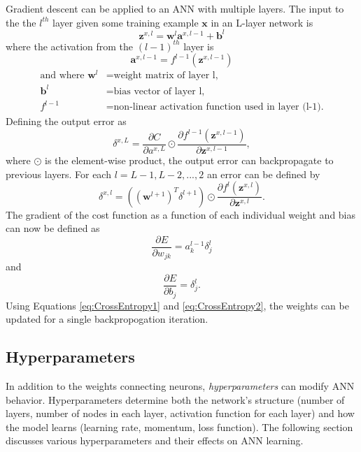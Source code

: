 Gradient descent can be applied to an ANN with multiple layers. The input to the the $l^{th}$ layer given some training example $\boldsymbol{x}$ in an L-layer network is 
\begin{equation}
\boldsymbol{z}^{x,l} = \boldsymbol{w}^{l}  \boldsymbol{a}^{x,l-1} + \boldsymbol{b}^{l}
\end{equation}
%
where the activation from the $(l-1)^{th}$ layer is
%
\begin{equation}
\boldsymbol{a}^{x,l-1} = f^{l-1}(\boldsymbol{z}^{x,l-1})
\end{equation}
\begin{align*}
  \text{and where } \boldsymbol{w}^{l} &= \text{weight matrix of layer l,} \\
  \boldsymbol{b}^{l} &= \text{bias vector of layer l,} \\
  f^{l-1} &= \text{non-linear activation function used in layer (l-1).}
\end{align*}
%
Defining the output error as 
%
\begin{equation}
\delta^{x,L} = \frac{\partial C}{\partial a^{x,L}} \odot \frac{\partial f^{l-1}(\boldsymbol{z}^{x,l-1}) }{\partial \boldsymbol{z}^{x,l-1}}, 
\end{equation}
%
where $\odot$ is the element-wise product, the output error can backpropagate to previous layers. For each $l=L-1,L-2,...,2$ an error can be defined by
%
\begin{equation}
\delta^{x,l} = ((\boldsymbol{w}^{l+1})^T \delta^{l+1}) \odot \frac{\partial f^{l}(\boldsymbol{z}^{x,l}) }{\partial \boldsymbol{z}^{x,l}}.
\end{equation}
%
The gradient of the cost function as a function of each individual weight and bias can now be defined as 
%
\begin{equation} \label{eq:CrossEntropy1}
\frac{\partial E}{\partial w_{jk}} = a^{l-1}_k \delta^l_j
\end{equation}
%
and 
%
\begin{equation} \label{eq:CrossEntropy2}
\frac{\partial E}{\partial b_j} = \delta^l_j.
\end{equation}
%
Using Equations \ref{eq:CrossEntropy1} and \ref{eq:CrossEntropy2}, the weights can be updated for a single backpropogation iteration. 


\subsection{Hyperparameters}

In addition to the weights connecting neurons, \textit{hyperparameters} can modify ANN behavior. Hyperparameters determine both the network's structure (number of layers, number of nodes in each layer, activation function for each layer) and how the model learns (learning rate, momentum, loss function). The following section discusses various hyperparameters and their effects on ANN learning.

